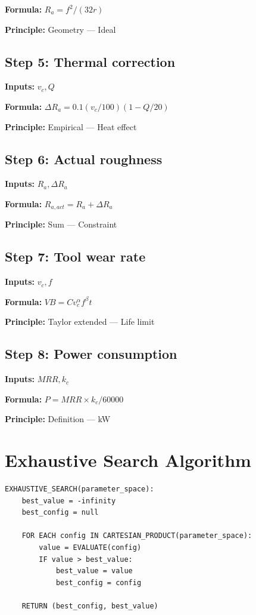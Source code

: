 \documentclass[11pt,twocolumn]{article}
\begin{document}
\textbf{Formula:} $R_a = f^2 / (32r)$

\textbf{Principle:} Geometry --- Ideal

\subsection*{Step 5: Thermal correction}
\textbf{Inputs:} $v_c, Q$

\textbf{Formula:} $\Delta R_a = 0.1(v_c/100)(1-Q/20)$

\textbf{Principle:} Empirical --- Heat effect

\subsection*{Step 6: Actual roughness}
\textbf{Inputs:} $R_a, \Delta R_a$

\textbf{Formula:} $R_{a,act} = R_a + \Delta R_a$

\textbf{Principle:} Sum --- Constraint

\subsection*{Step 7: Tool wear rate}
\textbf{Inputs:} $v_c, f$

\textbf{Formula:} $VB = C v_c^\alpha f^\beta t$

\textbf{Principle:} Taylor extended --- Life limit

\subsection*{Step 8: Power consumption}
\textbf{Inputs:} $MRR, k_c$

\textbf{Formula:} $P = MRR \times k_c / 60000$

\textbf{Principle:} Definition --- kW


\section{Exhaustive Search Algorithm}

\begin{verbatim}
EXHAUSTIVE_SEARCH(parameter_space):
    best_value = -infinity
    best_config = null
    
    FOR EACH config IN CARTESIAN_PRODUCT(parameter_space):
        value = EVALUATE(config)
        IF value > best_value:
            best_value = value
            best_config = config
    
    RETURN (best_config, best_value)
\end{verbatim}
\end{document}
